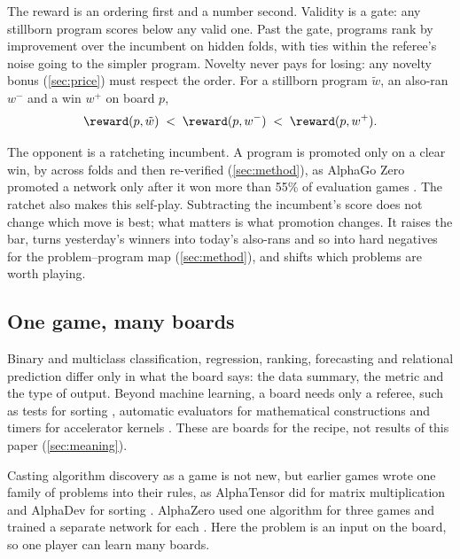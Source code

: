 The reward is an ordering first and a number second. Validity is a gate: any
stillborn program scores below any valid one. Past the gate, programs rank by
improvement over the incumbent on hidden folds, with ties within the referee's
noise going to the simpler program. Novelty never pays for losing: any novelty
bonus (\cref{sec:price}) must respect the order. For a stillborn program
$\tilde{w}$, an also-ran $w^-$ and a win $w^+$ on board $p$,
\[
  \reward(p, \tilde{w}) \;<\; \reward(p, w^-) \;<\; \reward(p, w^+).
\]

The opponent is a ratcheting incumbent. A program is promoted only on a clear
win, by  across  folds and then re-verified
(\cref{sec:method}), as AlphaGo Zero promoted a network only after it won more
than 55\% of evaluation games \citep{silver2017mastering}. The ratchet also
makes this self-play.
Subtracting the incumbent's score does not change which move is best; what
matters is what promotion changes. It raises the bar, turns yesterday's winners
into today's also-rans and so into hard negatives for the problem--program map
(\cref{sec:method}), and shifts which problems are worth playing.

\subsection{One game, many boards}\label{sub:game-boards}

Binary and multiclass classification, regression, ranking, forecasting and
relational prediction differ only in what the board says: the data summary, the
metric and the type of output. Beyond machine learning, a board needs only a referee, such as tests
for sorting \citep{mankowitz2023alphadev}, automatic evaluators for mathematical
constructions \citep{romeraparedes2024funsearch} and timers for accelerator
kernels \citep{novikov2025alphaevolve}. These are boards for the recipe, not
results of this paper (\cref{sec:meaning}).

Casting algorithm discovery as a game is not new, but earlier games wrote one
family of problems into their rules, as AlphaTensor did for matrix
multiplication and AlphaDev for sorting
\citep{fawzi2022alphatensor,mankowitz2023alphadev}. AlphaZero used one algorithm
for three games and trained a separate network for each
\citep{silver2018general}. Here the problem is an input on the board, so one
player can learn many boards.

